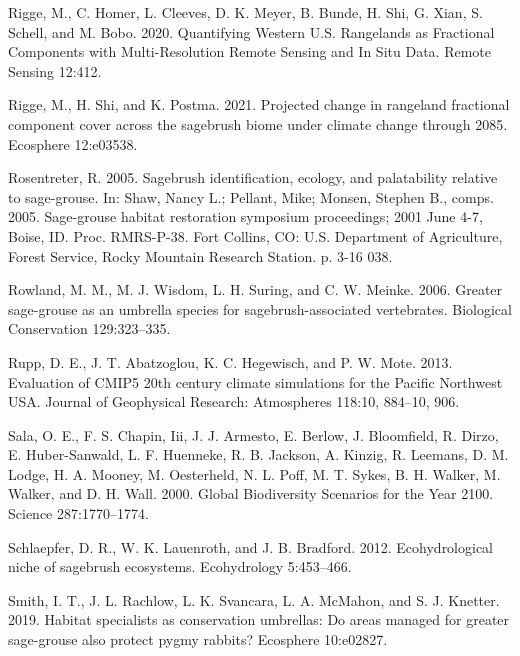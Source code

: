 \documentclass[
  12pt,
]{article}
\newlength{\cslhangindent}
\newenvironment{CSLReferences}[2] %
 {%
  \setlength{\parindent}{0pt}
  \ifodd #1 \everypar{\setlength{\hangindent}{\cslhangindent}}\ignorespaces\fi
  \ifnum #2 > 0
  \setlength{\parskip}{#2\baselineskip}
  \fi
 }%
 {}
\begin{document}
\begin{CSLReferences}{1}{0}
\leavevmode{}%
Rigge, M., C. Homer, L. Cleeves, D. K. Meyer, B. Bunde, H. Shi, G. Xian, S. Schell, and M. Bobo. 2020. Quantifying {Western} {U}.{S}. {Rangelands} as {Fractional} {Components} with {Multi}-{Resolution} {Remote} {Sensing} and {In} {Situ} {Data}. Remote Sensing 12:412.

\leavevmode{}%
Rigge, M., H. Shi, and K. Postma. 2021. Projected change in rangeland fractional component cover across the sagebrush biome under climate change through 2085. Ecosphere 12:e03538.

\leavevmode{}%
Rosentreter, R. 2005. Sagebrush identification, ecology, and palatability relative to sage-grouse. In: Shaw, Nancy L.; Pellant, Mike; Monsen, Stephen B., comps. 2005. Sage-grouse habitat restoration symposium proceedings; 2001 June 4-7, Boise, ID. Proc. RMRS-P-38. Fort Collins, CO: U.S. Department of Agriculture, Forest Service, Rocky Mountain Research Station. p. 3-16 038.

\leavevmode{}%
Rowland, M. M., M. J. Wisdom, L. H. Suring, and C. W. Meinke. 2006. Greater sage-grouse as an umbrella species for sagebrush-associated vertebrates. Biological Conservation 129:323--335.

\leavevmode{}%
Rupp, D. E., J. T. Abatzoglou, K. C. Hegewisch, and P. W. Mote. 2013. Evaluation of {CMIP5} 20th century climate simulations for the {Pacific} {Northwest} {USA}. Journal of Geophysical Research: Atmospheres 118:10, 884--10, 906.

\leavevmode{}%
Sala, O. E., F. S. Chapin, Iii, J. J. Armesto, E. Berlow, J. Bloomfield, R. Dirzo, E. Huber-Sanwald, L. F. Huenneke, R. B. Jackson, A. Kinzig, R. Leemans, D. M. Lodge, H. A. Mooney, M. Oesterheld, N. L. Poff, M. T. Sykes, B. H. Walker, M. Walker, and D. H. Wall. 2000. Global {Biodiversity} {Scenarios} for the {Year} 2100. Science 287:1770--1774.

\leavevmode{}%
Schlaepfer, D. R., W. K. Lauenroth, and J. B. Bradford. 2012. Ecohydrological niche of sagebrush ecosystems. Ecohydrology 5:453--466.

\leavevmode{}%
Smith, I. T., J. L. Rachlow, L. K. Svancara, L. A. McMahon, and S. J. Knetter. 2019. Habitat specialists as conservation umbrellas: {Do} areas managed for greater sage-grouse also protect pygmy rabbits? Ecosphere 10:e02827.


\end{CSLReferences}
\end{document}
